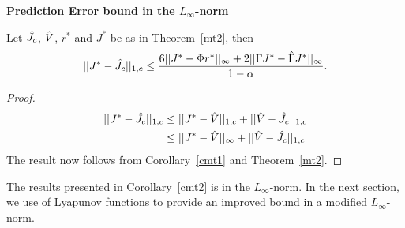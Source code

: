 \textbf{Prediction Error bound in the $L_\infty$-norm}\\
\begin{corollary}\label{cmt2}
Let $\hat{J}_c$, $\hat{V}$, $r^*$ and $J^*$ be as in Theorem~\ref{mt2}, then
\begin{align}\label{finalbnd}
||J^*-\hj||_{1,c}\leq\frac{6 ||J^*-\Phi r^*||_\infty+2||\Gamma J^*-\hg J^*||_\infty}{1-\alpha}.
\end{align}
\end{corollary}
\begin{proof}
\begin{align}
||J^*-\hat{J}_c||_{1,c}&\leq||J^*-\hat{V}||_{1,c}+||\hat{V}-\hat{J}_c||_{1,c}\nonumber\\
&\leq||J^*-\hat{V}||_\infty+||\hat{V}-\hat{J}_c||_{1,c}\nonumber
\end{align}
The result now follows from Corollary~\ref{cmt1} and Theorem~\ref{mt2}.
\end{proof}
The results presented in Corollary~\ref{cmt2} is in the $L_\infty$-norm. In the next section, we use of Lyapunov functions to provide an improved bound in a modified $L_\infty$-norm.
